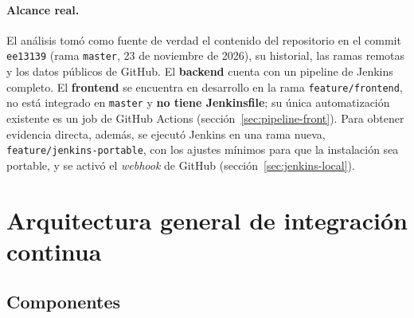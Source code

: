\documentclass[11pt,a4paper]{article}
\begin{document}
\paragraph{Alcance real.} El análisis tomó como fuente de verdad el contenido del repositorio en el
commit \texttt{ee13139} (rama \texttt{master}, 23 de noviembre de 2026), su historial, las ramas
remotas y los datos públicos de GitHub. El \textbf{backend} cuenta con un pipeline de Jenkins
completo. El \textbf{frontend} se encuentra en desarrollo en la rama \texttt{feature/frontend},
no está integrado en \texttt{master} y \textbf{no tiene Jenkinsfile}; su única automatización
existente es un job de GitHub Actions (sección~\ref{sec:pipeline-front}). Para obtener evidencia
directa, además, se ejecutó Jenkins en una rama nueva, \texttt{feature/jenkins-portable}, con los
ajustes mínimos para que la instalación sea portable, y se activó el \emph{webhook} de GitHub
(sección~\ref{sec:jenkins-local}).

\section{Arquitectura general de integración continua}
\label{sec:arquitectura}

\subsection{Componentes}
\end{document}
